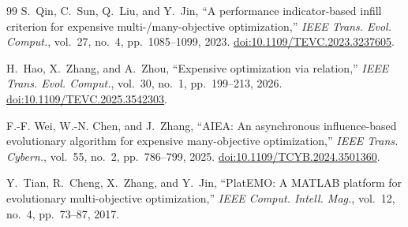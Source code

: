 \documentclass[final,5p,times,twocolumn]{elsarticle}
\begin{document}
\begin{thebibliography}{99}
S.~Qin, C.~Sun, Q.~Liu, and Y.~Jin,
``A performance indicator-based infill criterion for expensive
multi-/many-objective optimization,'' \emph{IEEE Trans. Evol. Comput.},
vol.~27, no.~4, pp.~1085--1099, 2023.
\href{https://doi.org/10.1109/TEVC.2023.3237605}{doi:10.1109/TEVC.2023.3237605}.

H.~Hao, X.~Zhang, and A.~Zhou,
``Expensive optimization via relation,'' \emph{IEEE Trans. Evol. Comput.},
vol.~30, no.~1, pp.~199--213, 2026.
\href{https://doi.org/10.1109/TEVC.2025.3542303}{doi:10.1109/TEVC.2025.3542303}.

F.-F. Wei, W.-N. Chen, and J.~Zhang,
``AIEA: An asynchronous influence-based evolutionary algorithm for expensive
many-objective optimization,'' \emph{IEEE Trans. Cybern.}, vol.~55, no.~2,
pp.~786--799, 2025.
\href{https://doi.org/10.1109/TCYB.2024.3501360}{doi:10.1109/TCYB.2024.3501360}.

Y.~Tian, R.~Cheng, X.~Zhang, and Y.~Jin,
``PlatEMO: A MATLAB platform for evolutionary multi-objective optimization,''
\emph{IEEE Comput. Intell. Mag.}, vol.~12, no.~4, pp.~73--87, 2017.

\end{thebibliography}
\end{document}
